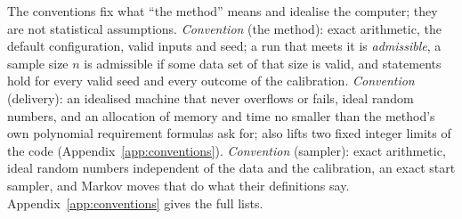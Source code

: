 The conventions fix what ``the method'' means and idealise the computer; they are not statistical assumptions.
\emph{Convention } (the method): exact arithmetic, the default configuration, valid inputs and seed; a run that
meets it is \emph{admissible}, a sample size $n$ is admissible if some data set of that size is valid, and statements
hold for every valid seed and every outcome of the calibration.
\label{asm:C1}%
\emph{Convention } (delivery): an idealised machine that never overflows or fails, ideal random numbers, and an
allocation of memory and time no smaller than the method's own polynomial requirement formulas ask for; \emph{} also lifts two fixed integer limits of the code (Appendix~\ref{app:conventions}).\label{asm:C2}\label{asm:C2p}
\emph{Convention } (sampler): exact arithmetic, ideal random numbers independent of the data and the calibration,
an exact start sampler, and Markov moves that do what their definitions say.\label{asm:C3}
Appendix~\ref{app:conventions} gives the full lists.
